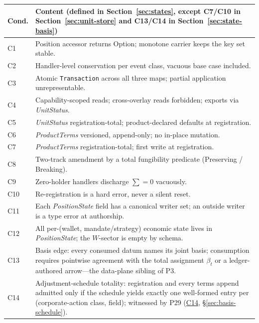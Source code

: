 \begin{center}
\small
\begin{longtable}{@{}p{1cm}p{10.4cm}@{}}
\toprule
\textbf{Cond.} & \textbf{Content (defined in Section~\ref{sec:states}, except C7/C10 in Section~\ref{sec:unit-store} and C13/C14 in Section~\ref{sec:state-basis})} \\
\midrule
\endhead
C1 & Position accessor returns Option; monotone carrier keeps the key set stable. \\
C2 & Handler-level conservation per event class, vacuous base case included. \\
C3 & Atomic \texttt{Transaction} across all three maps; partial application unrepresentable. \\
C4 & Capability-scoped reads; cross-overlay reads forbidden; exports via \emph{UnitStatus}. \\
C5 & \emph{UnitStatus} registration-total; product-declared defaults at registration. \\
C6 & \emph{ProductTerms} versioned, append-only; no in-place mutation. \\
C7 & \emph{ProductTerms} registration-total; first write at registration. \\
C8 & Two-track amendment by a total fungibility predicate (Preserving / Breaking). \\
C9 & Zero-holder handlers discharge $\sum=0$ vacuously. \\
C10 & Re-registration is a hard error, never a silent reset. \\
C11 & Each \emph{PositionState} field has a canonical writer set; an outside writer is a type error at authorship. \\
C12 & All per-(wallet, mandate/strategy) economic state lives in \emph{PositionState}; the $W$-sector is empty by schema. \\
C13 & Basis edge: every consumed datum names its joint basis; consumption requires pointwise agreement with the total assignment $\beta_t$ or a ledger-authored arrow---the data-plane sibling of P3. \\
C14 & Adjustment-schedule totality: registration and every terms append admitted only if the schedule yields exactly one well-formed entry per (corporate-action class, field); witnessed by P29 (\hyperref[cond:C14]{C14}, \S\ref{sec:basis-schedule}). \\
\bottomrule
\end{longtable}
\end{center}

